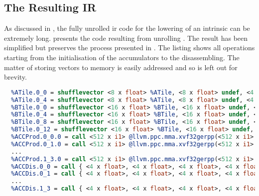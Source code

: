 \documentclass[\main/thesis.tex]{subfiles}
\begin{document}
\subsection{The Resulting IR}
\label{sec:unrolled}
As discussed in , the fully unrolled \gls{ir} code for the \gls{lowering} of an \gls{intrinsic} can be extremely long.
 presents the code resulting from unrolling .
The result has been simplified but preserves the process presented in .
The listing shows all operations starting from the initialisation of the accumulators to the disassembling.
The matter of storing vectors to memory is easily addressed and so is left out for brevity.

\begin{lstlisting}[caption={[Example Lowering of \code{llvm.matrix.multiply.*}.]An example lowering of the \code{llvm.matrix.multiply.*} intrinsic for a $8 \times 1 \times 16$ computation.},
      label=lst:unrolled,language=llvm,basicstyle=\small\ttfamily,float,escapechar=|,columns=flexible,breaklines=true,breakatwhitespace=true]
  %ACC = call <512 x i1> @llvm.ppc.mma.xxsetaccz()|\label{accz}|
  %ATile.0_0 = shufflevector <8 x float> %ATile, <8 x float> undef, <4 x i32> <i32 0, i32 1, i32 2, i32 3>|\label{aShuffle1}|
  %ATile.0_4 = shufflevector <8 x float> %ATile, <8 x float> undef, <4 x i32> <i32 4, i32 5, i32 6, i32 7>|\label{aShuffle2}|
  %BTile.0_0 = shufflevector <16 x float> %BTile, <16 x float> undef, <4 x i32> <i32 0, i32 1, i32 2, i32 3>|\label{bShuffle1}|
  %BTile.0_4 = shufflevector <16 x float> %BTile, <16 x float> undef, <4 x i32> <i32 4, i32 5, i32 6, i32 7>
  %BTile.0_8 = shufflevector <16 x float> %BTile, <16 x float> undef, <4 x i32> <i32 8, i32 9, i32 10, i32 11>
  %BTile.0_12 = shufflevector <16 x float> %BTile, <16 x float> undef, <4 x i32> <i32 12, i32 13, i32 14, i32 15>|\label{bShuffle2}|
  %ACCProd.0_0.0 = call <512 x i1> @llvm.ppc.mma.xvf32gerpp(<512 x i1> %ACC, <4 x float> %ATile.0_0, <4 x float> %BTile.0_0)|\label{accsBegin}|
  %ACCProd.0_1.0 = call <512 x i1> @llvm.ppc.mma.xvf32gerpp(<512 x i1> %ACC, <4 x float> %ATile.0_0, <4 x float> %BTile.0_4)
  ...
  %ACCProd.1_3.0 = call <512 x i1> @llvm.ppc.mma.xvf32gerpp(<512 x i1> %ACC, <4 x float> %ATile.0_4, <4 x float> %BTile.0_12)|\label{accsEnd}|
  %ACCDis.0_0 = call { <4 x float>, <4 x float>, <4 x float>, <4 x float> } @llvm.ppc.mma.disassemble.acc(<512 x i1> %ACCProd.0_0.0)|\label{dissStart}|
  %ACCDis.0_1 = call { <4 x float>, <4 x float>, <4 x float>, <4 x float> } @llvm.ppc.mma.disassemble.acc(<512 x i1> %ACCProd.0_1.0)
  ...
  %ACCDis.1_3 = call { <4 x float>, <4 x float>, <4 x float>, <4 x float> } @llvm.ppc.mma.disassemble.acc(<512 x i1> %ACCProd.1_3.0)|\label{dissEnd}|
\end{lstlisting}
\end{document}
